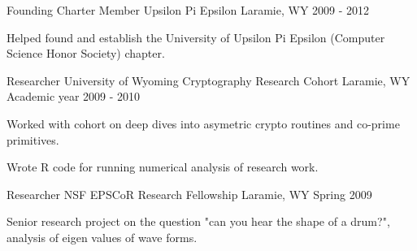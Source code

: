 \begin{cventries}
\cventry
{Founding Charter Member} %
{Upsilon Pi Epsilon} %
{Laramie, WY} %
{2009 - 2012} %
{ %
\begin{cvitems}
\item {Helped found and establish the University of Upsilon Pi Epsilon (Computer Science Honor Society) chapter.}
\end{cvitems}
}


\cventry
{Researcher} %
{University of Wyoming Cryptography Research Cohort} %
{Laramie, WY} %
{Academic year 2009 - 2010} %
{ %
\begin{cvitems}
\item {Worked with cohort on deep dives into asymetric crypto routines and co-prime primitives.}
\item {Wrote R code for running numerical analysis of research work.}
\end{cvitems}
}


\cventry
{Researcher} %
{NSF EPSCoR Research Fellowship} %
{Laramie, WY} %
{Spring 2009} %
{ %
\begin{cvitems}
\item {Senior research project on the question "can you hear the shape of a drum?", analysis of eigen values of wave forms.}
\end{cvitems}
}


\end{cventries}